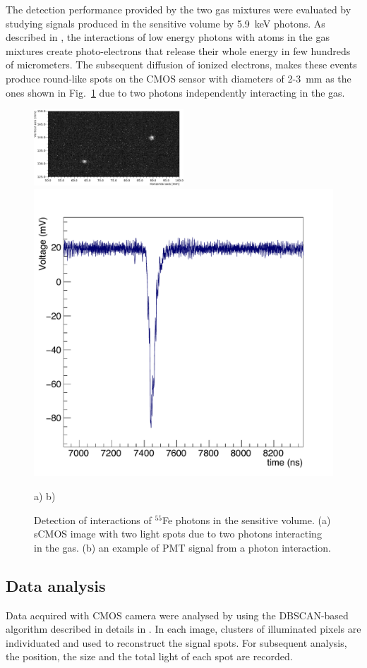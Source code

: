 \documentclass[a4paper,11pt]{article}
\begin{document}
The detection performance provided by the two gas mixtures were evaluated by studying signals produced in the sensitive volume by 5.9~keV photons.
As described in \cite{bib:fe55}, the interactions of low energy photons with atoms in the gas mixtures create photo-electrons that release their whole energy in few hundreds of micrometers.
The subsequent diffusion of ionized electrons, makes these events produce round-like spots on the CMOS sensor with diameters of 2-3~mm as the ones shown in Fig.~\ref{fig:spot} due to two photons independently interacting in the gas.

\begin{figure}[ht]
\begin{center}
\includegraphics[width=0.5\textwidth]{Figures/I31Run2163.pdf}
\includegraphics[width=0.288\linewidth]{Figures/WaveformIron2.pdf}
\end{center}
\vspace{-0.6cm}
\hspace{5.5cm} \mbox{a)} \hspace{5.0cm} \mbox{b)}
\vspace{-0.3cm}

\caption{Detection of interactions of $^{55}$Fe photons in the sensitive volume. (a) sCMOS image with two light spots due to two photons interacting in the gas. (b) an example of PMT signal from a photon interaction.} 
\label{fig:spot}
\end{figure}

\subsection{Data analysis}

Data acquired with CMOS camera were analysed by using the DBSCAN-based algorithm described in details in \cite{bib:algo}. In each image, clusters of illuminated pixels are individuated and used to reconstruct the signal spots.
For subsequent analysis, the position, the size and the total light of each spot are recorded.
\end{document}
